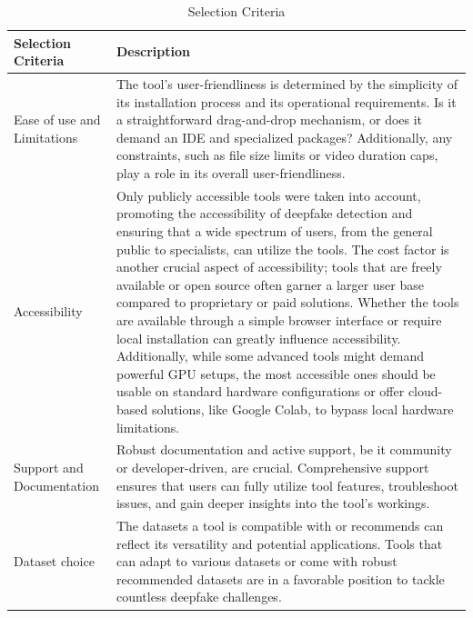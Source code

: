 \begin{table}[htpb]
	\caption{Selection Criteria}\label{tab:selection_criteria}
	\centering
	\small
	\begin{tabularx}{\textwidth}{l X}
		\toprule
		\textbf{Selection Criteria} & \textbf{Description}                       \\
		\midrule
		Ease of use and Limitations & The tool's user-friendliness is determined
		by the simplicity of its installation process and its operational
		requirements. Is it a straightforward drag-and-drop mechanism, or does
		it demand an \ac{IDE} and specialized packages? Additionally, any constraints, such
		as file size limits or video duration caps, play a role in its overall
		user-friendliness.                                                       \\
		\addlinespace
		Accessibility               & Only publicly accessible tools were taken
		into account, promoting the accessibility of deepfake detection and
		ensuring that a wide spectrum of users, from the general public to
		specialists, can utilize the tools. The cost factor is another crucial
		aspect of accessibility; tools that are freely available or open
		source often garner a larger user base compared to proprietary or paid
		solutions. Whether the tools are available through a simple browser
		interface or require local installation can greatly influence
		accessibility. Additionally, while some advanced tools might demand
		powerful GPU setups, the most accessible ones should be usable on
		standard hardware configurations or offer cloud-based solutions, like
		Google Colab, to bypass local hardware limitations.                      \\
		\addlinespace
		Support and Documentation   & Robust documentation and active support,
		be it community or developer-driven, are crucial. Comprehensive support
		ensures that users can fully utilize tool features, troubleshoot issues,
		and gain deeper insights into the tool's workings.                       \\
		\addlinespace
		Dataset choice              & The datasets a tool is compatible with or
		recommends can reflect its versatility and potential applications.
		Tools that can adapt to various datasets or come with robust recommended
		datasets are in a favorable position to tackle countless deepfake
		challenges.                                                              \\
		\bottomrule
	\end{tabularx}
\end{table}

